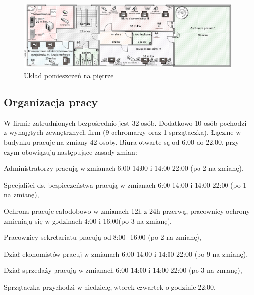 \begin{landscape}
	\begin{figure}[!h]
		\vspace{3cm}
		\includegraphics[width=24cm]{uklad_pomieszczen_poziom1.png}
		\caption{Układ pomieszczeń na piętrze}
		\label{schemat:uklad_pomieszczen_poziom1}
	\end{figure}
\end{landscape}

\newpage
\subsection{Organizacja pracy}
W firmie zatrudnionych bezpośrednio jest 32 osób. Dodatkowo 10 osób pochodzi z wynajętych zewnętrznych firm (9 ochroniarzy oraz 1 sprzątaczka). Łącznie w budynku pracuje na zmiany 42 osoby. Biura otwarte są od 6.00 do 22.00, przy czym obowiązują następujące zasady zmian:

\hspace{-0.5cm}\begin{minipage}{13.5cm}
	\begin{itemize*}
		\item Administratorzy pracują w zmianach 6:00-14:00 i 14:00-22:00 \linebreak (po 2 na zmianę),
		\item Specjaliści ds. bezpieczeństwa pracują w zmianach 6:00-14:00 i 14:00-22:00  (po 1 na zmianę),
		\item Ochrona pracuje całodobowo w zmianach 12h z 24h przerwą, pracownicy ochrony zmieniają się w godzinach 4:00 i 16:00(po 3 na zmianę),
		\item Pracownicy sekretariatu pracują od 8:00- 16:00 (po 2 na zmianę),
		\item Dział ekonomistów pracuj w zmianach 6:00-14:00 i 14:00-22:00 \linebreak (po 9 na zmianę),
		\item Dział sprzedaży pracują w zmianach 6:00-14:00 i 14:00-22:00 \linebreak (po 3 na zmianę),
		\item Sprzątaczka przychodzi w niedzielę, wtorek czwartek o godzinie 22:00.
	\end{itemize*}
\end{minipage}

